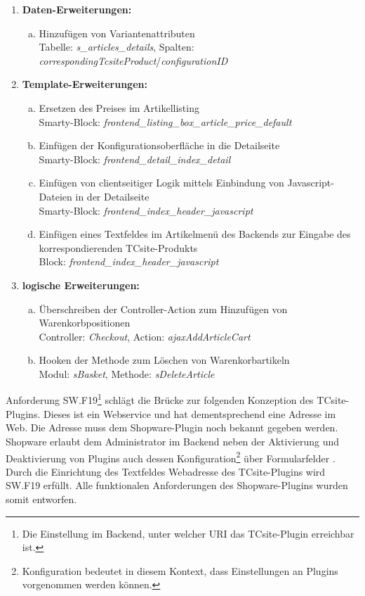 \documentclass[11pt, a4paper, titlepage, listof=totoc, bibliography=totoc, index=totoc, twoside, openright, headings=normal]{scrreprt}
\begin{document}
\begin{enumerate}
\item \textbf{Daten-Erweiterungen:}
\begin{enumerate}[(a)]
\item Hinzufügen von Variantenattributen\\
Tabelle: \emph{s\_articles\_details}, Spalten: \emph{correspondingTcsiteProduct}/\emph{configurationID}
\end{enumerate}
\item \textbf{Template-Erweiterungen:}
\begin{enumerate}[(a)]
\item Ersetzen des Preises im Artikellisting\\Smarty-Block: \emph{frontend\_listing\_box\_article\_price\_default}
\item Einfügen der Konfigurationsoberfläche in die Detailseite\\Smarty-Block: \emph{frontend\_detail\_index\_detail}
\item Einfügen von clientseitiger Logik mittels Einbindung von Javascript-Dateien in der Detailseite\\Smarty-Block: \emph{frontend\_index\_header\_javascript}
\item Einfügen eines Textfeldes im Artikelmenü des Backends zur Eingabe des korrespondierenden TCsite-Produkts\\Block: \emph{frontend\_index\_header\_javascript}
\end{enumerate}
\item \textbf{logische Erweiterungen:}
\begin{enumerate}[(a)]
\item Überschreiben der Controller-Action zum Hinzufügen von Warenkorbpositionen\\
Controller: \emph{Checkout}, Action: \emph{ajaxAddArticleCart}
\item \glqq Hooken\grqq{} der Methode zum Löschen von Warenkorbartikeln\\
Modul: \emph{sBasket}, Methode: \emph{sDeleteArticle}
\end{enumerate}
\end{enumerate}

Anforderung SW.F19\footnote{Die Einstellung im Backend, unter welcher URI das TCsite-Plugin erreichbar ist.} schlägt die Brücke zur folgenden Konzeption des TCsite-Plugins. Dieses ist ein Webservice und hat dementsprechend eine Adresse im Web. Die Adresse muss dem Shopware-Plugin noch bekannt gegeben werden. Shopware erlaubt dem Administrator im Backend neben der Aktivierung und Deaktivierung von Plugins auch dessen \glqq Konfiguration\grqq{}\footnote{Konfiguration bedeutet in diesem Kontext, dass Einstellungen an Plugins vorgenommen werden können.} über Formularfelder \citep{shopwarePluginKonfiguration}. Durch die Einrichtung des Textfeldes \glqq Webadresse des TCsite-Plugins\grqq{} wird SW.F19 erfüllt. Alle funktionalen Anforderungen des Shopware-Plugins wurden somit entworfen.
\end{document}
